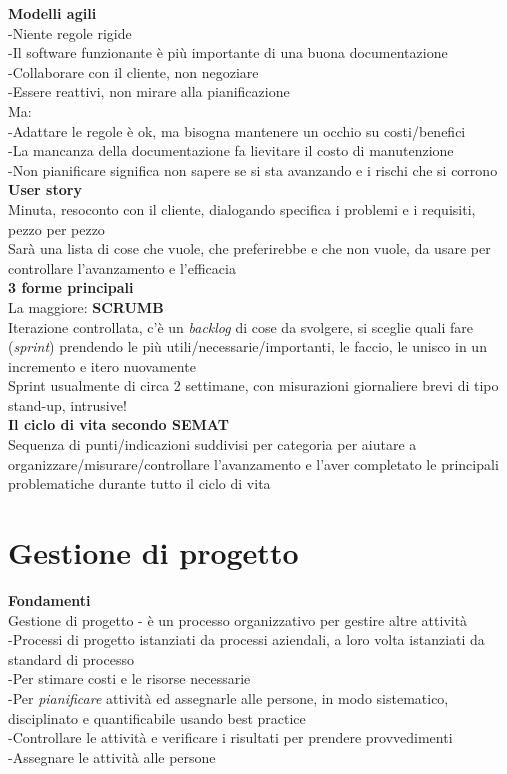 \documentclass{article}
\begin{document}
		\textbf{Modelli agili}\\
		-Niente regole rigide\\
		-Il software funzionante è più importante di una buona documentazione\\
		-Collaborare con il cliente, non negoziare\\
		-Essere reattivi, non mirare alla pianificazione\\
		Ma:\\
		-Adattare le regole è ok, ma bisogna mantenere un occhio su costi/benefici\\
		-La mancanza della documentazione fa lievitare il costo di manutenzione\\
		-Non pianificare significa non sapere se si sta avanzando e i rischi che si corrono\\
		\textbf{User story}\\
		Minuta, resoconto con il cliente, dialogando specifica i problemi e i requisiti, pezzo per pezzo\\
		Sarà una lista di cose che vuole, che preferirebbe e che non vuole, da usare per controllare l'avanzamento e l'efficacia\\
		\textbf{3 forme principali}\\
		La maggiore: \textbf{SCRUMB}\\
		Iterazione controllata, c'è un \textit{backlog} di cose da svolgere, si sceglie quali fare (\textit{sprint}) prendendo le più utili/necessarie/importanti, le faccio, le unisco in un incremento e itero nuovamente\\
		Sprint usualmente di circa 2 settimane, con misurazioni giornaliere brevi di tipo stand-up, intrusive!\\
		
		\textbf{Il ciclo di vita secondo SEMAT}\\
		Sequenza di punti/indicazioni suddivisi per categoria per aiutare a organizzare/misurare/controllare l'avanzamento e l'aver completato le principali problematiche durante tutto il ciclo di vita\\
		
		
	\clearpage
	\section{Gestione di progetto}
		\textbf{Fondamenti}\\
		Gestione di progetto - è un processo organizzativo per gestire altre attività\\
		-Processi di progetto istanziati da processi aziendali, a loro volta istanziati da standard di processo\\
		-Per stimare costi e le risorse necessarie\\
		-Per \textit{pianificare} attività ed assegnarle alle persone, in modo sistematico, disciplinato e quantificabile usando best practice\\
		-Controllare le attività e verificare i risultati per prendere provvedimenti\\
		-Assegnare le attività alle persone\\
		
\end{document}
